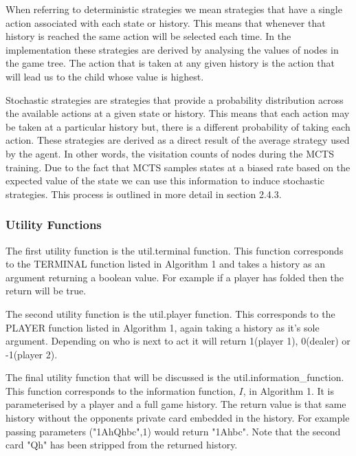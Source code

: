 When referring to deterministic strategies we mean strategies that have a single
action associated with each state or history.
This means that whenever that history is reached the same action will be selected each time.
In the implementation these strategies are derived by analysing the values of nodes in the game tree.
The action that is taken at any given history is the action that will lead us to the child whose
value is highest.

Stochastic strategies are strategies that provide a probability distribution across the available actions
at a given state or history.
This means that each action may be taken at a particular history but,  there is a different probability
of taking each action.
These strategies are derived as a direct result of the average strategy used by the agent.
In other words, the visitation counts of nodes during the MCTS training.
Due to the fact that MCTS samples states at a biased rate based on the expected value of the state we
can use this information to induce stochastic strategies.
This process is outlined in more detail in section 2.4.3.

\subsubsection{Utility Functions}\label{subsec:utility}
The first utility function is the util.terminal function.
This function corresponds to the TERMINAL function listed in Algorithm 1 and
takes a history as an argument returning a boolean value.
For example if a player has folded then the return will be true.

The second utility function is the util.player function.
This corresponds to the PLAYER function listed in Algorithm 1, again taking a history as it's sole argument.
Depending on who is next to act it will return 1(player 1), 0(dealer) or -1(player 2).

The final utility function that will be discussed is the util.information\_function.
This function corresponds to the information function, $I$, in Algorithm 1.
It is parameterised by a player and a full game history.
The return value is that same history without the opponents private card
embedded in the history.
For example passing parameters ("1AhQhbc",1) would return "1Ahbc".
Note that the second card "Qh" has been stripped from the returned history.

